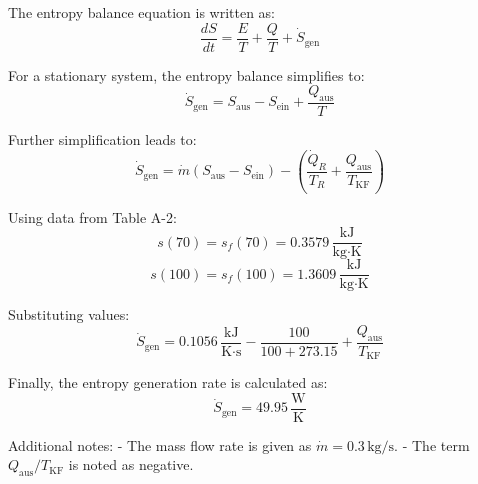 The entropy balance equation is written as:  
\[
\frac{dS}{dt} = \frac{E}{T} + \frac{Q}{T} + \dot{S}_{\text{gen}}
\]  

For a stationary system, the entropy balance simplifies to:  
\[
\dot{S}_{\text{gen}} = S_{\text{aus}} - S_{\text{ein}} + \frac{Q_{\text{aus}}}{T}
\]  

Further simplification leads to:  
\[
\dot{S}_{\text{gen}} = \dot{m} \left( S_{\text{aus}} - S_{\text{ein}} \right) - \left( \frac{\dot{Q}_R}{T_R} + \frac{Q_{\text{aus}}}{T_{\text{KF}}} \right)
\]  

Using data from Table A-2:  
\[
s(70) = s_f(70) = 0.3579 \, \frac{\text{kJ}}{\text{kg·K}}
\]  
\[
s(100) = s_f(100) = 1.3609 \, \frac{\text{kJ}}{\text{kg·K}}
\]  

Substituting values:  
\[
\dot{S}_{\text{gen}} = 0.1056 \, \frac{\text{kJ}}{\text{K·s}} - \frac{100}{100 + 273.15} + \frac{Q_{\text{aus}}}{T_{\text{KF}}}
\]  

Finally, the entropy generation rate is calculated as:  
\[
\dot{S}_{\text{gen}} = 49.95 \, \frac{\text{W}}{\text{K}}
\]  

Additional notes:  
- The mass flow rate is given as \( \dot{m} = 0.3 \, \text{kg/s} \).  
- The term \( Q_{\text{aus}} / T_{\text{KF}} \) is noted as negative.